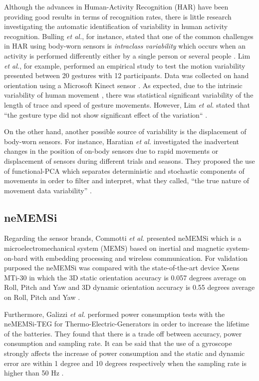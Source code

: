\documentclass[9pt,journal,onecolumn,compsoc]{IEEEtran}
\begin{document}
Although the advances in Human-Activity Recognition (HAR) have been providing good results in terms of recognition rates,
there is little research investigating the automatic identification of variability in human activity recognition.
Bulling \textit{et al.}, for instance, stated that one of the common challenges in HAR 
using body-worn sensors is \textit{intraclass variability} which occurs when 
an activity is performed differently either by a single person or several people \cite{bulling2014} . 
Lim \textit{et al.}, for example, performed an empirical study to test the motion variability 
presented between 20 gestures with 12 participants. %
Data was collected on hand orientation using a Microsoft Kinect sensor \cite{Lim2012}. %
As expected, due to the intrinsic variability of human movement \cite{newell1993variability}, 
there was statistical significant variability of the length of trace and speed of gesture movements.
However, Lim \textit{et al.} stated that ``the gesture type did not show significant effect of the variation`` \cite{Lim2012}.

On the other hand, another possible source of variability is the displacement of body-worn sensors. 
For instance, Haratian \textit{et al.} investigated the inadvertent changes in the position of on-body sensors 
due to rapid movements or displacement of sensors during different trials and seasons.
They proposed the use of functional-PCA 
which separates deterministic and stochastic components of movements
in order to filter and interpret, what they called, ``the true nature of movement data variability'' 
\cite{Haratian2012,Haratian2014,Haratian2016}.

\subsection{neMEMSi}

Regarding the sensor brands, 
Commotti \textit{et al.} presented neMEMSi which is a microelectromechanical system (MEMS)  based on 
inertial and magnetic system-on-bard with embedding processing and wireless communication.
For validation purposed the neMEMSi was compared with the state-of-the-art device Xsens MTi-30
in which the 3D static orientation accuracy is 0.057 degrees average on Roll, Pitch and Yaw 
and 3D dynamic orientation accuracy is 0.55 degrees average on Roll, Pitch and Yaw \cite{Comotti2014}.

Furthermore, Galizzi \textit{et al.} performed power consumption tests with the 
neMEMSi-TEG for Thermo-Electric-Generators in order to increase the lifetime of the batteries.
They found that there is a trade off between accuracy, power consumption and sampling rate.
It can be said that the use of a gyroscope strongly affects the increase of power consumption
and the static and dynamic error are within 1 degree and 10 degrees respectively 
when the sampling rate is higher than 50 Hz \cite{Galizzi2015}.
\end{document}

